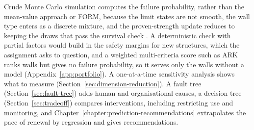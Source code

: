 Crude Monte Carlo simulation computes the failure probability, rather than
the mean-value approach or FORM, because the limit states are not smooth, the wall type enters as a
discrete mixture, and the proven-strength update reduces to keeping the draws
that pass the survival check \parencite{hemel2024}. A deterministic check with
partial factors would build in the safety margins for new structures, which the assignment asks to question, and a weighted multi-criteria score such as ARK ranks walls but gives no failure probability, so it serves only the walls without a model (Appendix~\ref{app:portfolio}). A
one-at-a-time sensitivity analysis shows what to measure
(Section~\ref{sec:dimension-reduction}). A fault tree
(Section~\ref{sec:fault-tree}) adds human and organisational causes, a decision
tree (Section~\ref{sec:tradeoff}) compares interventions, including
restricting use and monitoring, and Chapter~\ref{chapter:prediction-recommendations}
extrapolates the pace of renewal by regression and gives recommendations.
